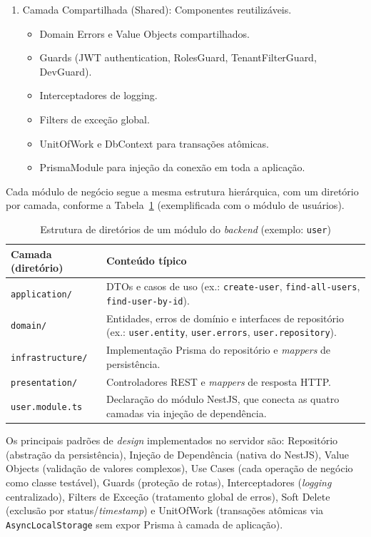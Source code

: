 \begin{enumerate}
\item Camada Compartilhada (Shared): Componentes reutilizáveis.
\begin{itemize}
    \item Domain Errors e Value Objects compartilhados.
    \item Guards (JWT authentication, RolesGuard, TenantFilterGuard, DevGuard).
    \item Interceptadores de logging.
    \item Filters de exceção global.
    \item UnitOfWork e DbContext para transações atômicas.
    \item PrismaModule para injeção da conexão em toda a aplicação.
\end{itemize}
\end{enumerate}

Cada módulo de negócio segue a mesma estrutura hierárquica, com um diretório por camada, conforme a Tabela~\ref{tab:modulo_estrutura} (exemplificada com o módulo de usuários).

\begin{table}[H]
\centering
\caption{Estrutura de diretórios de um módulo do \textit{backend} (exemplo: \texttt{user})}
\label{tab:modulo_estrutura}
\begin{tabularx}{\textwidth}{l X}
\toprule
\textbf{Camada (diretório)} & \textbf{Conteúdo típico} \\
\midrule
\texttt{application/}    & DTOs e casos de uso (ex.: \texttt{create-user}, \texttt{find-all-users}, \texttt{find-user-by-id}). \\
\texttt{domain/}         & Entidades, erros de domínio e interfaces de repositório (ex.: \texttt{user.entity}, \texttt{user.errors}, \texttt{user.repository}). \\
\texttt{infrastructure/} & Implementação Prisma do repositório e \textit{mappers} de persistência. \\
\texttt{presentation/}   & Controladores REST e \textit{mappers} de resposta HTTP. \\
\texttt{user.module.ts}  & Declaração do módulo NestJS, que conecta as quatro camadas via injeção de dependência. \\
\bottomrule
\end{tabularx}
\end{table}

Os principais padrões de \textit{design} implementados no servidor são: Repositório (abstração da persistência), Injeção de Dependência (nativa do NestJS), Value Objects (validação de valores complexos), Use Cases (cada operação de negócio como classe testável), Guards (proteção de rotas), Interceptadores (\textit{logging} centralizado), Filters de Exceção (tratamento global de erros), Soft Delete (exclusão por status/\textit{timestamp}) e UnitOfWork (transações atômicas via \texttt{AsyncLocalStorage} sem expor Prisma à camada de aplicação).

